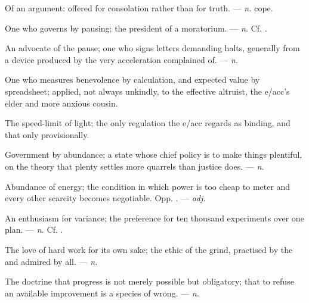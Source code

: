  Of an argument: offered for consolation rather than for truth. ---  \textit{n.}  cope. 

 One who governs by pausing; the president of a moratorium.   ---  \textit{n.} Cf. .

 An advocate of the pause; one who signs letters demanding halts, generally from a device produced by the very acceleration complained of. ---  \textit{n.}

 One who measures benevolence by calculation, and expected value by spreadsheet; applied, not always unkindly, to the effective altruist, the e/acc's elder and more anxious cousin.

 The speed-limit of light; the only regulation the e/acc regards as binding, and that only provisionally.

 Government by abundance; a state whose chief policy is to make things plentiful, on the theory that plenty settles more quarrels than justice does. ---  \textit{n.}

 Abundance of energy; the condition in which power is too cheap to meter and every other scarcity becomes negotiable. Opp. . ---  \textit{adj.}

 An enthusiasm for variance; the preference for ten thousand experiments over one plan. ---  \textit{n.} Cf. .

 The love of hard work for its own sake; the ethic of the grind, practised by the  and admired by all. ---  \textit{n.}

 The doctrine that progress is not merely possible but obligatory; that to refuse an available improvement is a species of wrong. ---  \textit{n.}

